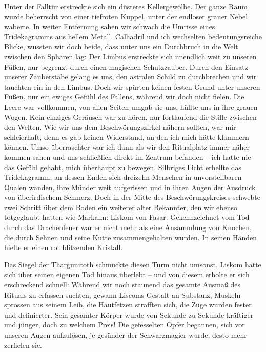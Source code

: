 Unter der Falltür erstreckte sich ein düsteres Kellergewölbe. Der ganze Raum wurde beherrscht von einer tiefroten Kuppel, unter der endloser grauer Nebel waberte. In weiter Entfernung sahen wir schwach die Umrisse eines Tridekagramms aus hellem Metall. Calhadril und ich wechselten bedeutungsreiche Blicke, wussten wir doch beide, dass unter uns ein Durchbruch in die Welt zwischen den Sphären lag: Der Limbus erstreckte sich unendlich weit zu unseren Füßen, nur begrenzt durch einen magischen Schutzzauber. Durch den Einsatz unserer Zauberstäbe gelang es uns, den astralen Schild zu durchbrechen und wir tauchten ein in den Limbus. Doch wir spürten keinen festen Grund unter unseren Füßen, nur ein ewiges Gefühl des Fallens, während wir doch nicht fielen. Die Leere war vollkommen, von allen Seiten umgab sie uns, hüllte uns in ihre grauen Wogen. Kein einziges Geräusch war zu hören, nur fortlaufend die Stille zwischen den Welten. Wie wir uns dem Beschwörungszirkel nähern sollten, war mir schleierhaft, denn es gab keinen Widerstand, an den ich mich hätte klammern können. Umso überraschter war ich dann als wir den Ritualplatz immer näher kommen sahen und uns schließlich direkt im Zentrum befanden -- ich hatte nie das Gefühl gehabt, mich überhaupt zu bewegen. Silbriges Licht erhellte das Tridekagramm, an dessen Enden sich dreizehn Menschen in unvorstellbaren Qualen wanden, ihre Münder weit aufgerissen und in ihren Augen der Ausdruck von überirdischem Schmerz. Doch in der Mitte des Beschwörungskreises schwebte zwei Schritt über dem Boden ein weiterer alter Bekannter, den wir ebenso totgeglaubt hatten wie Markalm: Liskom von Fasar. Gekennzeichnet vom Tod durch das Drachenfeuer war er nicht mehr als eine Ansammlung von Knochen, die durch Sehnen und seine Kutte zusammengehalten wurden. In seinen Händen hielte er einen rot blitzenden Kristall. 


Das Siegel der Thargunitoth schmückte diesen Turm nicht umsonst. Liskom hatte sich über seinen eigenen Tod hinaus überlebt -- und von diesem erholte er sich erschreckend schnell: Während wir noch staunend das gesamte Ausmaß des Rituals zu erfassen suchten, gewann Liscoms Gestalt an Substanz, Muskeln sprossen aus seinem Leib, die Hautfetzen strafften sich, die Züge wurden fester und definierter. Sein gesamter Körper wurde von Sekunde zu Sekunde kräftiger und jünger, doch zu welchem Preis! Die gefesselten Opfer begannen, sich vor unseren Augen aufzulösen, je gesünder der Schwarzmagier wurde, desto mehr zerfielen sie. 


